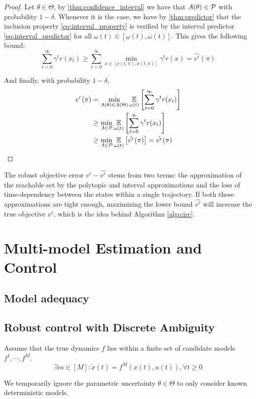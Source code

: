 \documentclass{article}
\begin{document}
\begin{proof}
Let $\theta\in\Theta$, by \autoref{thm:confidence_interval} we have that $A(\theta) \in \mathcal{P}$ with probability $1-\delta$. Whenever it is the case, we have by \autoref{thm:predictor} that the inclusion property \eqref{eq:interval_property} is verified by the interval predictor \eqref{eq:interval_predictor} for all $\omega(t)\in[\underline{\omega}(t), \overline{\omega}(t)]$. This gives the following bound:
\begin{equation*}
 \sum_{t=0}^\infty \gamma^t r(x_t) \geq \sum_{t=0}^\infty \min_{x\in[\underline{x}(t, \pi), \overline{x}(t, \pi)]} \gamma^t r(x) = \hat{v^r}(\pi)
\end{equation*}

And finally, with probability $1-\delta$,
\begin{align*}
v^r(\pi) &= \min_{A(\theta) \in A(\Theta)} \operatorname*{\mathbb{E}}\limits_{\omega(t)}\left[\sum_{t=0}^\infty \gamma^t r(x_t)\right] \\
&\geq \min_{A \in \mathcal{P}} \operatorname*{\mathbb{E}}\limits_{\omega(t)}\left[\sum_{t=0}^\infty \gamma^t r(x_t)\right] \\
& \geq \min_{A \in \mathcal{P}} \operatorname*{\mathbb{E}}\limits_{\omega(t)}\left[\hat{v^r}(\pi)\right] = \hat{v^r}(\pi)
\end{align*}
\end{proof}

The robust objective error $v^r - \hat{v^r}$ stems from two terms: the approximation of the reachable set by the polytopic and interval approximations and the loss of time-dependency between the states within a single trajectory. If both these approximations are tight enough, maximizing the lower bound $\hat{v^r}$ will increase the true objective $v^r$, which is the idea behind Algorithm \ref{algo:irc}.

\section{Multi-model Estimation and Control}

\subsection{Model adequacy}
\subsection{Robust control with Discrete Ambiguity}


\begin{assumption}
Assume that the true dynamics $f$ lies within a finite set of candidate models $f^1, \cdots, f^M$.
\begin{equation}
\exists m\in[M]: \dot{x}(t) = f^M(x(t), u(t)), \forall t\geq 0
\end{equation}

We temporarily ignore the parametric uncertainty $\theta\in\Theta$ to only consider known deterministic models.
\end{assumption}
\end{document}
